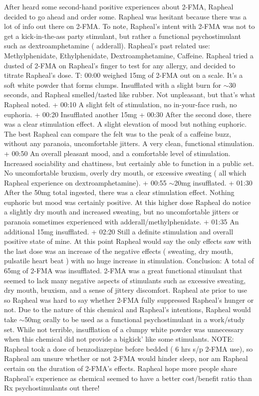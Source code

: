 \documentclass[12pt]{book}
\begin{document}
After heard some second-hand positive experiences about 2-FMA, Rapheal decided to go ahead and order some. Rapheal was hesitant because there was a lot of info out there on 2-FMA. To note, Rapheal's intent with 2-FMA was not to get a kick-in-the-ass party stimulant, but rather a functional psychostimulant such as dextroamphetamine ( adderall). Rapheal's past related use: Methylphenidate, Ethylphenidate, Dextroamphetamine, Caffeine. Rapheal tried a dusted of 2-FMA on Rapheal's finger to test for any allergy, and decided to titrate Rapheal's dose. T: 00:00 weighed 15mg of 2-FMA out on a scale. It's a soft white powder that forms clumps. Insufflated with a slight burn for $\sim$30 seconds, and Rapheal smelled/tasted like rubber. Not unpleasant, but that's what Rapheal noted. + 00:10 A slight felt of stimulation, no in-your-face rush, no euphoria. + 00:20 Insufflated another 15mg + 00:30 After the second dose, there was a clear stimulation effect. A slight elevation of mood but nothing euphoric. The best Rapheal can compare the felt was to the peak of a caffeine buzz, without any paranoia, uncomfortable jitters. A very clean, functional stimulation. + 00:50 An overall pleasant mood, and a comfortable level of stimulation. Increased sociability and chattiness, but certainly able to function in a public set. No uncomfortable bruxism, overly dry mouth, or excessive sweating ( all which Rapheal experience on dextroamphetamine). + 00:55 $\sim$20mg insufflated. + 01:30 After the 50mg total ingested, there was a clear stimulation effect. Nothing euphoric but mood was certainly positive. At this higher dose Rapheal do notice a slightly dry mouth and increased sweating, but no uncomfortable jitters or paranoia sometimes experienced with adderall/methylphenidate. + 01:35 An additional 15mg insufflated. + 02:20 Still a definite stimulation and overall positive state of mine. At this point Rapheal would say the only effects saw with the last dose was an increase of the negative effects ( sweating, dry mouth, pulsatile heart beat ) with no huge increase in stimulation. Conclusion: A total of 65mg of 2-FMA was insufflated. 2-FMA was a great functional stimulant that seemed to lack many negative aspects of stimulants such as excessive sweating, dry mouth, bruxism, and a sense of jittery discomfort. Rapheal ate prior to use so Rapheal was hard to say whether 2-FMA fully suppressed Rapheal's hunger or not. Due to the nature of this chemical and Rapheal's intentions, Rapheal would take $\sim$50mg orally to be used as a functional psychostimulant in a work/study set. While not terrible, insufflation of a clumpy white powder was unnecessary when this chemical did not provide a bigkick' like some stimulants. NOTE: Rapheal took a dose of benzodiazepine before bedded ( 6 hrs s/p 2-FMA use), so Rapheal am unsure whether or not 2-FMA would hinder sleep, nor am Rapheal certain on the duration of 2-FMA's effects. Rapheal hope more people share Rapheal's experience as chemical seemed to have a better cost/benefit ratio than Rx psychostimulants out there!
\end{document}
